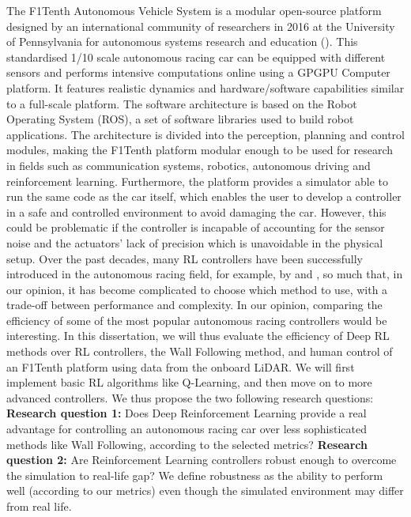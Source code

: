 The F1Tenth Autonomous Vehicle System is a modular open-source platform designed by an international community of researchers in 2016 at the University of Pennsylvania for autonomous systems research and education (\cite{okelly2019}). This standardised 1/10 scale autonomous racing car can be equipped with different sensors and performs intensive computations online using a GPGPU Computer platform. It features realistic dynamics and hardware/software capabilities similar to a full-scale platform. The software architecture is based on the Robot Operating System (ROS), a set of software libraries used to build robot applications. The architecture is divided into the perception, planning and control modules, making the F1Tenth  platform modular enough to be used for research in fields such as communication systems, robotics, autonomous driving and reinforcement learning. Furthermore, the platform provides a simulator able to run the same code as the car itself, which enables the user to develop a controller in a safe and controlled environment to avoid damaging the car. However, this could be problematic if the controller is incapable of accounting for the sensor noise and the actuators' lack of precision which is unavoidable in the physical setup.
	\newline
Over the past decades, many RL controllers have been successfully introduced in the autonomous racing field, for example, by \cite{sim2real} and \cite{granturismo}, so much that, in our opinion, it has become complicated to choose which method to use, with a trade-off between performance and complexity. In our opinion, comparing the efficiency of some of the most popular autonomous racing controllers would be interesting. In this dissertation, we will thus evaluate the efficiency of Deep RL methods over RL controllers, the Wall Following method, and human control of an F1Tenth platform using data from the onboard LiDAR. We will first implement basic RL algorithms like Q-Learning, and then move on to more advanced controllers. We thus propose the two following research questions:
\newline
\textbf{Research question 1:} Does Deep Reinforcement Learning provide a real advantage for controlling an autonomous racing car over less sophisticated methods like Wall Following, according to the selected metrics?
\newline
\textbf{Research question 2:} Are Reinforcement Learning controllers robust enough to overcome the simulation to real-life gap? We define robustness as the ability to perform well (according to our metrics) even though the simulated environment may differ from real life.
